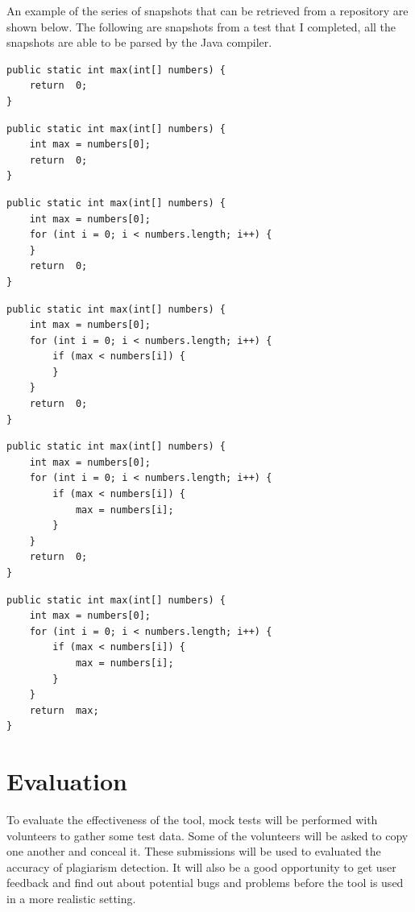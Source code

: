 \documentclass[twocolumn]{article}
\begin{document}
An example of the series of snapshots that can be retrieved from a repository
are shown below. The following are snapshots from a test that I completed, all
the snapshots are able to be parsed by the Java compiler.
\begin{lstlisting}[frame=single]
public static int max(int[] numbers) {
	return 	0;
}
\end{lstlisting}
\begin{lstlisting}[frame=single]
public static int max(int[] numbers) {
	int max = numbers[0];
	return 	0;
}
\end{lstlisting}
\begin{lstlisting}[frame=single]
public static int max(int[] numbers) {
	int max = numbers[0];
	for (int i = 0; i < numbers.length; i++) {
	}
	return 	0;
}
\end{lstlisting}
\begin{lstlisting}[frame=single]
public static int max(int[] numbers) {
	int max = numbers[0];
	for (int i = 0; i < numbers.length; i++) {
		if (max < numbers[i]) {
		}
	}
	return 	0;
}
\end{lstlisting}
\begin{lstlisting}[frame=single]
public static int max(int[] numbers) {
	int max = numbers[0];
	for (int i = 0; i < numbers.length; i++) {
		if (max < numbers[i]) {
			max = numbers[i];
		}
	}
	return 	0;
}
\end{lstlisting}
\begin{lstlisting}[frame=single]
public static int max(int[] numbers) {
	int max = numbers[0];
	for (int i = 0; i < numbers.length; i++) {
		if (max < numbers[i]) {
			max = numbers[i];
		}
	}
	return 	max;
}
\end{lstlisting}

\section{Evaluation}
To evaluate the effectiveness of the tool, mock tests will be performed with
volunteers to gather some test data. Some of the volunteers will be asked to
copy one another and conceal it. These submissions will be used to evaluated the
accuracy of plagiarism detection. It will also be a good opportunity to get user
feedback and find out about potential bugs and problems before the tool is used
in a more realistic setting.
\end{document}
